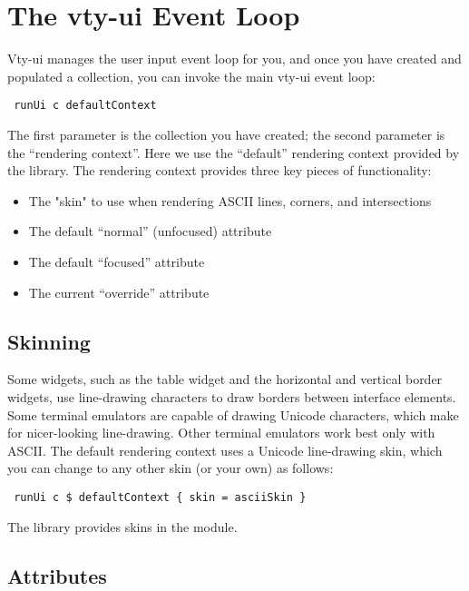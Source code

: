 \section{The vty-ui Event Loop}
\label{sec:event_loop}

Vty-ui manages the user input event loop for you, and once you have
created and populated a collection, you can invoke the main vty-ui event
loop:

\begin{verbatim}
 runUi c defaultContext
\end{verbatim}

The first parameter is the collection you have created; the second
parameter is the ``rendering context''.  Here we use the ``default''
rendering context provided by the library.  The rendering context
provides three key pieces of functionality:

\begin{itemize}
\item The "skin" to use when rendering ASCII lines, corners, and
      intersections
\item The default ``normal'' (unfocused) attribute
\item The default ``focused'' attribute
\item The current ``override'' attribute
\end{itemize}

\subsection{Skinning}

Some widgets, such as the table widget and the horizontal and vertical
border widgets, use line-drawing characters to draw borders between
interface elements.  Some terminal emulators are capable of drawing
Unicode characters, which make for nicer-looking line-drawing.  Other
terminal emulators work best only with ASCII.  The default rendering
context uses a Unicode line-drawing skin, which you can change to any
other skin (or your own) as follows:

\begin{verbatim}
 runUi c $ defaultContext { skin = asciiSkin }
\end{verbatim}

The library provides skins in the  module.

\subsection{Attributes}
\label{sec:attributes}

